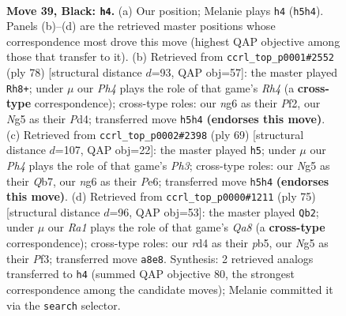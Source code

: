 \documentclass[11pt]{article}
\begin{document}
\begin{figure}[p]\centering
\begin{subfigure}{0.46\textwidth}\centering
\resizebox{\linewidth}{!}{%
\newchessgame
\chessboard[
  setfen={r7/1pk3p1/p1n2pN1/2Q3np/3R4/4P1P1/PPR2PBP/7K b - - 8 39},
  showmover=false,
  pgfstyle=straightmove, color=movearrow, markmove={h5-h4}
]}
\caption{}
\end{subfigure}\hfill
\begin{subfigure}{0.46\textwidth}\centering
\resizebox{\linewidth}{!}{%
\newchessgame
\chessboard[
  setfen={5k2/p4rp1/1p2p3/3pP3/3P1p1R/P1Nq4/1P1n1PP1/3Q2K1 w - - 8 40},
  showmover=false,
  pgfstyle=straightmove, color=movearrow, markmove={h4-h8}
]}
\caption{}
\end{subfigure}
\\[4pt]
\begin{subfigure}{0.46\textwidth}\centering
\resizebox{\linewidth}{!}{%
\newchessgame
\chessboard[
  setfen={6k1/1q3p2/4p1pp/3nP3/3P3P/6P1/3Q1P2/r1B2RK1 b - - 0 35},
  showmover=false,
  pgfstyle=straightmove, color=movearrow, markmove={h6-h5}
]}
\caption{}
\end{subfigure}\hfill
\begin{subfigure}{0.46\textwidth}\centering
\resizebox{\linewidth}{!}{%
\newchessgame
\chessboard[
  setfen={8/2p2ppk/6np/1PPR4/8/3Q1pPP/5P2/q3rBK1 b - - 0 38},
  showmover=false,
  pgfstyle=straightmove, color=movearrow, markmove={a1-b2}
]}
\caption{}
\end{subfigure}
\caption{\textbf{Move 39, Black: \texttt{h4}.} (a) Our position; Melanie plays \texttt{h4} (\texttt{h5h4}). Panels (b)--(d) are the retrieved master positions whose correspondence most drove this move (highest QAP objective among those that transfer to it). (b) Retrieved from \texttt{ccrl\_top\_p0001\#2552} (ply 78) [structural distance $d$=93, QAP obj=57]: the master played \texttt{Rh8+}; under $\mu$ our \emph{Ph4} plays the role of that game's \emph{Rh4} (a \textbf{cross-type} correspondence); cross-type roles: our \emph{n}g6 as their \emph{P}f2, our \emph{N}g5 as their \emph{P}d4; transferred move \texttt{h5h4} \textbf{(endorses this move)}. (c) Retrieved from \texttt{ccrl\_top\_p0002\#2398} (ply 69) [structural distance $d$=107, QAP obj=22]: the master played \texttt{h5}; under $\mu$ our \emph{Ph4} plays the role of that game's \emph{Ph3}; cross-type roles: our \emph{N}g5 as their \emph{Q}b7, our \emph{n}g6 as their \emph{P}e6; transferred move \texttt{h5h4} \textbf{(endorses this move)}. (d) Retrieved from \texttt{ccrl\_top\_p0000\#1211} (ply 75) [structural distance $d$=96, QAP obj=53]: the master played \texttt{Qb2}; under $\mu$ our \emph{Ra1} plays the role of that game's \emph{Qa8} (a \textbf{cross-type} correspondence); cross-type roles: our \emph{r}d4 as their \emph{p}b5, our \emph{N}g5 as their \emph{P}f3; transferred move \texttt{a8e8}. Synthesis: 2 retrieved analogs transferred to \texttt{h4} (summed QAP objective 80, the strongest correspondence among the candidate moves); Melanie committed it via the \texttt{search} selector.}
\label{fig:thought-m77}
\end{figure}
\end{document}
